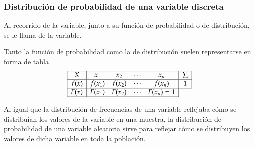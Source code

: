 \begin{frame}
\frametitle{Distribución de probabilidad de una variable discreta}
Al recorrido de la variable, junto a su función de probabilidad o de distribución, se le llama  de la variable.

Tanto la función de probabilidad como la de distribución suelen representarse en forma de tabla
\[
\begin{array}{|c|cccc|c|}
\hline
X & x_1 & x_2 & \cdots & x_n & \sum\\ \hline
f(x) & f(x_1) & f(x_2) & \cdots & f(x_n) & 1\\
\hline
F(x) & F(x_1) & F(x_2) & \cdots & F(x_n) =1 &\multicolumn{1}{|c}{} \\
\cline{1-5}
\end{array}
\]

Al igual que la distribución de frecuencias de una variable reflejaba cómo se distribuían los valores de la variable en una muestra, la
distribución de probabilidad de una variable aleatoria sirve para reflejar cómo se distribuyen los valores de dicha variable en toda la
población.

\end{frame}


